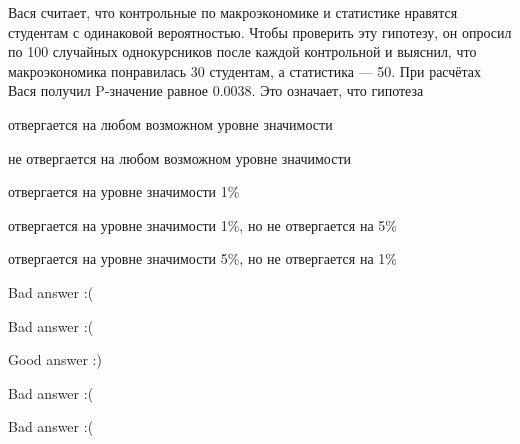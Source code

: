 
\begin{question}
Вася считает, что контрольные по макроэкономике и статистике нравятся
студентам с одинаковой вероятностью. Чтобы проверить эту гипотезу, он
опросил по 100 случайных однокурсников после каждой контрольной и
выяснил, что макроэкономика понравилась 30 студентам, а статистика ---
50. При расчётах Вася получил P-значение равное 0.0038. Это означает,
что гипотеза
\begin{answerlist}
  \item отвергается на любом возможном уровне значимости
  \item не отвергается на любом возможном уровне значимости
  \item отвергается на уровне значимости 1\%
  \item отвергается на уровне значимости 1\%, но не отвергается на 5\%
  \item отвергается на уровне значимости 5\%, но не отвергается на 1\%
\end{answerlist}
\end{question}

\begin{solution}
\begin{answerlist}
  \item Bad answer :(
  \item Bad answer :(
  \item Good answer :)
  \item Bad answer :(
  \item Bad answer :(
\end{answerlist}
\end{solution}

